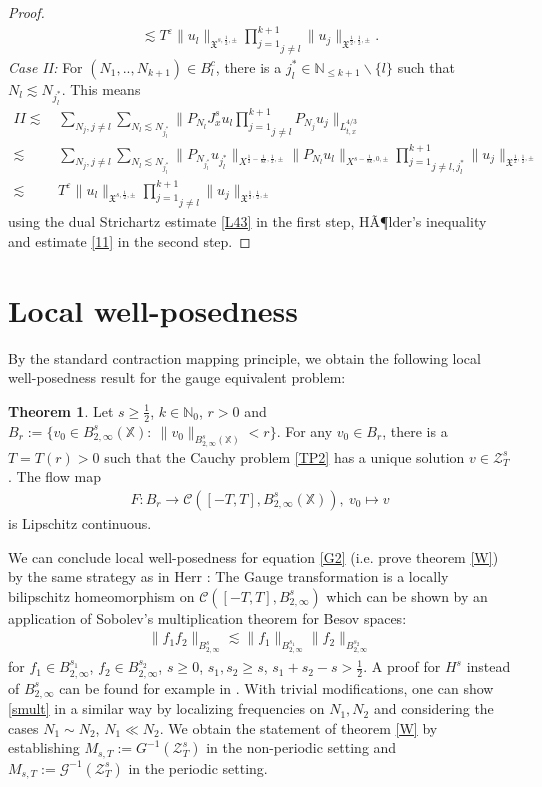 \documentclass[reqno]{amsart}
\theoremstyle{Definitionl}
\theoremstyle{Definitionk}
\theoremstyle{definition}
\theoremstyle{Satzk}
\newtheorem{satzk}[defi]{Theorem}
\theoremstyle{Satzl}
\theoremstyle{Bemerkung}
\begin{document}
\begin{proof}
\begin{align*}
\lesssim T^{\varepsilon}\|u_l\|_{\mathfrak X^{s,\frac12,\pm}}\underset{j\ne l}{\prod_{j=1}^{k+1}}\|u_j\|_{\mathfrak X^{\frac12,\frac12,\pm}}.
\end{align*}
\emph{Case II: }For $(N_1,..,N_{k+1})\in B_l^c$, there is a $j_l^\ast\in\mathbb N_{\le{k+1}}\smallsetminus\{l\}$ such that $N_l\lesssim N_{j_l^\ast}$. This means
\begin{align*}
II\lesssim&\, \sum_{N_j,j\ne l}\sum_{N_l\lesssim N_{j_l^\ast}}\Big\|P_{N_l}J_x^su_l\underset{j\ne l}{\prod_{j=1}^{k+1}}P_{N_j}u_j\Big\|_{L^{4/3}_{t,x}}\\
\lesssim&\, \sum_{N_j,j\ne l}\sum_{N_l\lesssim N_{j_l^\ast}}\big\|P_{N_{j^\ast_l}}u_{j^\ast_l}\big\|_{X^{\frac12-\frac{1}{8k},\frac12,\pm}}\big\|P_{N_l}u_l\big\|_{X^{s-\frac{1}{8k},0,\pm}}\underset{j\ne l,j_l^\ast}{\prod_{j=1}^{k+1}}\|u_j\|_{\mathfrak X^{\frac12,\frac12,\pm}}\\
\lesssim&\, T^{\varepsilon}\|u_l\|_{\mathfrak X^{s,\frac12,\pm}}\underset{j\ne l}{\prod_{j=1}^{k+1}}\|u_j\|_{\mathfrak X^{\frac12,\frac12,\pm}}
\end{align*}
using the dual Strichartz estimate \eqref{L43} in the first step, HÃ¶lder's inequality and estimate \eqref{11} in the second step.
\end{proof}
\section{Local well-posedness}
By the standard contraction mapping principle, we obtain the following local well-posedness result for the gauge equivalent problem:
\begin{satzk}\label{WT}
Let $s\ge\tfrac12$, $k\in\mathbb N_0$, $r>0$ and $B_r:=\{v_0\in B^s_{2,\infty}(\mathbb X):\ \|v_0\|_{B^{s}_{2,\infty}(\mathbb X)}<r\}$. For any $v_0\in B_r$, there is a $T=T(r)>0$ such that the Cauchy problem \eqref{TP2} has a unique solution $v\in\mathcal Z^s_T$. The flow map
\begin{align*}
F\colon B_r\to \mathcal C([-T,T],B^s_{2,\infty}(\mathbb X)),\ v_0\mapsto v
\end{align*}
is Lipschitz continuous.
\end{satzk}
We can conclude local well-posedness for equation \eqref{G2} (i.e. prove theorem \ref{W}) by the same strategy as in Herr \cite{Herr}: The Gauge transformation is a locally bilipschitz homeomorphism on $\mathcal C([-T,T],B^s_{2,\infty})$ which can be shown by an application of Sobolev's multiplication theorem for Besov spaces:
\begin{align}
\|f_1f_2\|_{B^s_{2,\infty}}\lesssim \|f_1\|_{B^{s_1}_{2,\infty}}\|f_2\|_{B^{s_2}_{2,\infty}}\label{smult}
\end{align}
for $f_1\in B^{s_1}_{2,\infty}$, $f_2\in B^{s_2}_{2,\infty}$, $s\ge0$, $s_1,s_2\ge s$, $s_1+s_2-s>\tfrac12$. A proof for $H^s$ instead of $B^s_{2,\infty}$ can be found for example in \cite[Corollary 1.1.12]{HerrDiss}. With trivial modifications, one can show \eqref{smult} in a similar way by localizing frequencies on $N_1,N_2$ and considering the cases $N_1\sim N_2$, $N_1\ll N_2$. We obtain the statement of theorem \ref{W} by establishing $M_{s,T}:=G^{-1}(\mathcal Z^s_T)$ in the non-periodic setting and $M_{s,T}:=\mathcal G^{-1}(\mathcal Z^s_T)$ in the periodic setting.
\end{document}

